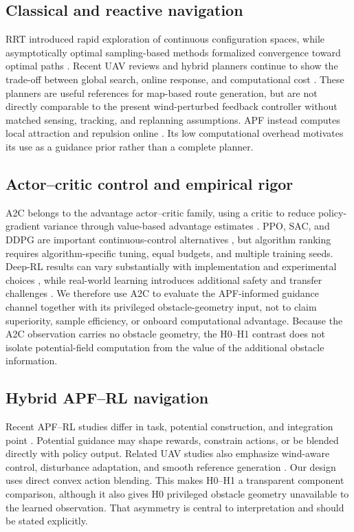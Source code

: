 \documentclass[conference]{IEEEtran}
\begin{document}
\subsection{Classical and reactive navigation}
RRT introduced rapid exploration of continuous configuration spaces, while asymptotically optimal sampling-based methods formalized convergence toward optimal paths \cite{lavalle1998rrt,karaman2011sampling}. Recent UAV reviews and hybrid planners continue to show the trade-off between global search, online response, and computational cost \cite{zheng2025uav,li2024gapf}. These planners are useful references for map-based route generation, but are not directly comparable to the present wind-perturbed feedback controller without matched sensing, tracking, and replanning assumptions. APF instead computes local attraction and repulsion online \cite{khatib1986real}. Its low computational overhead motivates its use as a guidance prior rather than a complete planner.

\subsection{Actor--critic control and empirical rigor}
A2C belongs to the advantage actor--critic family, using a critic to reduce policy-gradient variance through value-based advantage estimates \cite{mnih2016a3c}. PPO, SAC, and DDPG are important continuous-control alternatives \cite{schulman2017ppo,haarnoja2018sac,lillicrap2016ddpg}, but algorithm ranking requires algorithm-specific tuning, equal budgets, and multiple training seeds. Deep-RL results can vary substantially with implementation and experimental choices \cite{henderson2018deep}, while real-world learning introduces additional safety and transfer challenges \cite{dulac2021challenges,tobin2017domain}. We therefore use A2C to evaluate the APF-informed guidance channel together with its privileged obstacle-geometry input, not to claim superiority, sample efficiency, or onboard computational advantage. Because the A2C observation carries no obstacle geometry, the H0--H1 contrast does not isolate potential-field computation from the value of the additional obstacle information.

\subsection{Hybrid APF--RL navigation}
Recent APF--RL studies differ in task, potential construction, and integration point \cite{jin2025hybrid,xiao2025vapf,lee2025apfppo}. Potential guidance may shape rewards, constrain actions, or be blended directly with policy output. Related UAV studies also emphasize wind-aware control, disturbance adaptation, and smooth reference generation \cite{wu2024wind,neuralfly2022,datt2021,mellinger2011minimum}. Our design uses direct convex action blending. This makes H0--H1 a transparent component comparison, although it also gives H0 privileged obstacle geometry unavailable to the learned observation. That asymmetry is central to interpretation and should be stated explicitly.
\end{document}
